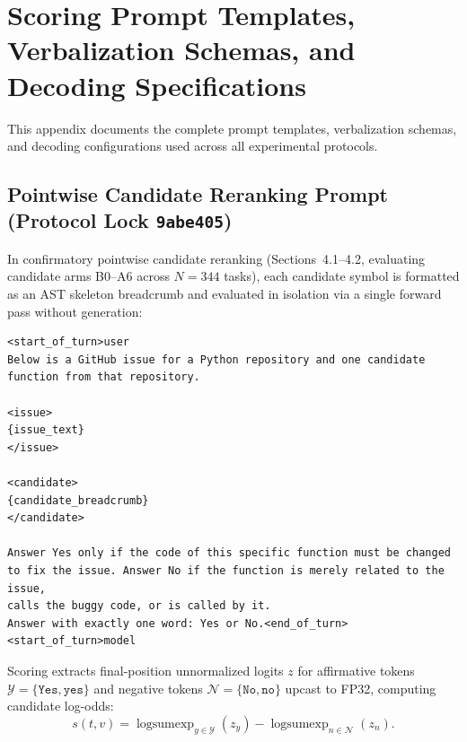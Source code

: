 \documentclass[10pt]{article}
\begin{document}
\section{Scoring Prompt Templates, Verbalization Schemas, and Decoding Specifications}
\label{app:prompt_templates}

This appendix documents the complete prompt templates, verbalization schemas, and decoding configurations used across all experimental protocols.

\subsection{Pointwise Candidate Reranking Prompt (Protocol Lock \texttt{9abe405})}
In confirmatory pointwise candidate reranking (Sections~4.1--4.2, evaluating candidate arms B0--A6 across $N=344$ tasks), each candidate symbol is formatted as an AST skeleton breadcrumb and evaluated in isolation via a single forward pass without generation:
\begin{lstlisting}[basicstyle=\ttfamily\scriptsize,breaklines=true]
<start_of_turn>user
Below is a GitHub issue for a Python repository and one candidate function from that repository.

<issue>
{issue_text}
</issue>

<candidate>
{candidate_breadcrumb}
</candidate>

Answer Yes only if the code of this specific function must be changed
to fix the issue. Answer No if the function is merely related to the issue,
calls the buggy code, or is called by it.
Answer with exactly one word: Yes or No.<end_of_turn>
<start_of_turn>model
\end{lstlisting}
Scoring extracts final-position unnormalized logits $z$ for affirmative tokens $\mathcal{Y} = \{\texttt{Yes}, \texttt{yes}\}$ and negative tokens $\mathcal{N} = \{\texttt{No}, \texttt{no}\}$ upcast to FP32, computing candidate log-odds:
\begin{equation}
s(t, v) = \operatorname{logsumexp}_{y \in \mathcal{Y}}(z_y) - \operatorname{logsumexp}_{n \in \mathcal{N}}(z_n).
\end{equation}
\end{document}

